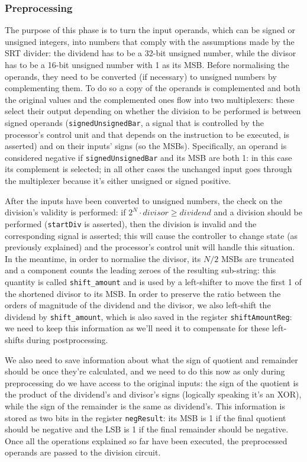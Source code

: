 \subsubsection{Preprocessing}\label{preprocessing_ch}
The purpose of this phase is to turn the input operands, which can be signed or unsigned integers, into numbers that comply with the assumptions made by the SRT divider: the dividend has to be a 32-bit unsigned number, while the divisor has to be a 16-bit unsigned number with 1 as its MSB.
Before normalising the operands, they need to be converted (if necessary) to unsigned numbers by complementing them.
To do so a copy of the operands is complemented and both the original values and the complemented ones flow into two multiplexers: these select their output depending on whether the division to be performed is between signed operands (\texttt{signedUnsignedBar}, a signal that is controlled by the processor's control unit and that depends on the instruction to be executed, is asserted) and on their inputs' signs (so the MSBs).
Specifically, an operand is considered negative if \texttt{signedUnsignedBar} and its MSB are both 1: in this case its complement is selected; in all other cases the unchanged input goes through the multiplexer because it's either unsigned or signed positive.

After the inputs have been converted to unsigned numbers, the check on the division's validity is performed: if $2^N \cdot divisor \ge dividend$ and a division should be performed (\texttt{startDiv} is asserted), then the division is invalid and the corresponding signal is asserted; this will cause the controller to change state (as previously explained) and the processor's control unit will handle this situation.
In the meantime, in order to normalise the divisor, its $N/2$ MSBs are truncated and a component counts the leading zeroes of the resulting sub-string: this quantity is called \texttt{shift\_amount} and is used by a left-shifter to move the first 1 of the shortened divisor to its MSB.
In order to preserve the ratio between the orders of magnitude of the dividend and the divisor, we also left-shift the dividend by \texttt{shift\_amount}, which is also saved in the register \texttt{shiftAmountReg}: we need to keep this information as we'll need it to compensate for these left-shifts during postprocessing.

We also need to save information about what the sign of quotient and remainder should be once they're calculated, and we need to do this now as only during preprocessing do we have access to the original inputs: the sign of the quotient is the product of the dividend's and divisor's signs (logically speaking it's an XOR), while the sign of the remainder is the same as dividend's.
This information is stored as two bits in the register \texttt{negResult}: its MSB is 1 if the final quotient should be negative and the LSB is 1 if the final remainder should be negative.
Once all the operations explained so far have been executed, the preprocessed operands are passed to the division circuit.

